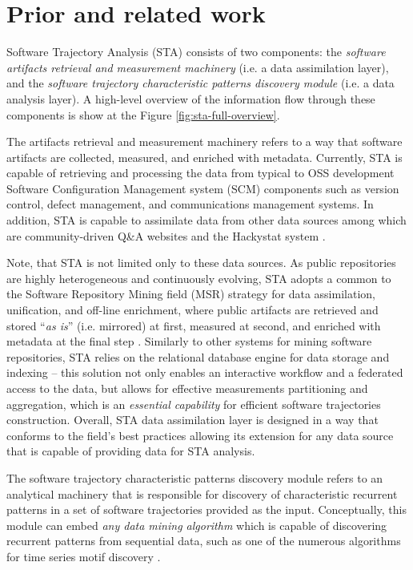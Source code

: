 \chapter{Prior and related work}\label{chapter_background_work}
Software Trajectory Analysis (STA) consists of two components: 
the \textit{software artifacts retrieval and measurement machinery} (i.e. a data assimilation layer), 
and the \textit{software trajectory characteristic patterns discovery module} (i.e. a data analysis layer). 
A high-level overview of the information flow through these components is show at the Figure \ref{fig:sta-full-overview}.

The artifacts retrieval and measurement machinery refers to a way that software artifacts are collected, 
measured, and enriched with metadata. 
Currently, STA is capable of retrieving and processing the data from typical to OSS development Software 
Configuration Management system (SCM) components such as version control, 
defect management, and communications management systems. 
In addition, STA is capable to assimilate data from other data sources among which are community-driven 
Q\&A websites and the Hackystat system \cite{csdl2-10-09}.

Note, that STA is not limited only to these data sources.
As public repositories are highly heterogeneous and continuously evolving, STA adopts a common to the 
Software Repository Mining field (MSR) strategy for data assimilation, unification, and off-line enrichment,
where public artifacts are retrieved and stored ``\textit{as is}'' (i.e. mirrored) at first, 
measured at second, and enriched with metadata at the final step 
\cite{citeulike:12550438} \cite{german04_softchange} \cite{cvsanaly}.
Similarly to other systems for mining software repositories, STA relies on the relational database engine 
for data storage and indexing -- this solution not only enables an interactive workflow and a federated 
access to the data, but allows for effective measurements partitioning and aggregation, which is 
an \textit{essential capability} for efficient software trajectories construction.
Overall, STA data assimilation layer is designed in a way that conforms to the field's best practices
allowing its extension for any data source that is capable of providing data for STA analysis.

The software trajectory characteristic patterns discovery module refers to an analytical machinery that 
is responsible for discovery of characteristic recurrent patterns in a set of software trajectories provided as 
the input. Conceptually, this module can embed \textit{any data mining algorithm} which is capable of 
discovering recurrent patterns from sequential data, such as one of the numerous algorithms for time series 
motif discovery \cite{citeulike:13197378}.

